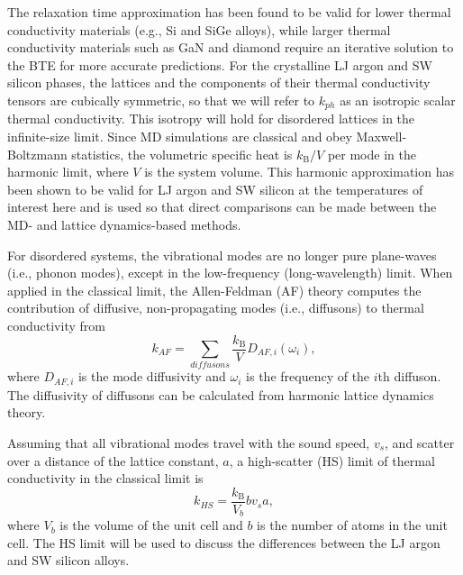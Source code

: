 \documentclass[12pt,twocolumn,iop]{/usr/share/texmf/tex/latex/iop/iopart}[/usr/share/texmf/tex/latex/iop/]
\begin{document}
The relaxation time approximation has been found to be valid  
for lower thermal conductivity materials 
(e.g., Si and SiGe alloys),
\cite{broido_intrinsic_2007,ward_intrinsic_2010,garg_role_2011} 
while larger thermal conductivity 
materials such as GaN and diamond require an  
iterative solution to the BTE for more accurate predictions.
\cite{ward_ab_2009,lindsay_thermal_2012} 
For the crystalline LJ argon and SW silicon phases, 
the lattices and the components of their 
thermal conductivity tensors are cubically symmetric, 
so that we will refer to 
$k_{ph}$ as an isotropic scalar thermal conductivity. 
This isotropy will hold for disordered lattices 
in the infinite-size limit. 
Since MD simulations are classical 
and obey Maxwell-Boltzmann 
statistics,\cite{mcquarrie_statistical_2000} the volumetric 
specific heat is $k_{\text{B}}/V$ per mode in the harmonic limit, where $V$ 
is the system volume. This harmonic approximation has been shown to be valid 
for LJ argon and SW silicon at the temperatures of interest here
\cite{mcgaughey_quantitative_2004,goicochea_thermal_2010} 
and is used so that direct comparisons can be made between 
the MD- and lattice dynamics-based methods.

For disordered systems, the vibrational modes are no 
longer pure plane-waves (i.e., phonon modes), except in the low-frequency 
(long-wavelength) limit. When applied in the classical limit, 
the Allen-Feldman (AF) theory computes 
the contribution of diffusive, non-propagating modes (i.e., diffusons) 
to thermal conductivity from\cite{allen_thermal_1993} 
\begin{equation}\label{EQ:M:k_AF}
k_{AF} = \sum_{diffusons} \frac{k_{\text{B}}}{V} D_{AF,i}(\omega_i),
\end{equation}
where $D_{AF,i}$ is the mode diffusivity and $\omega_i$ is the 
frequency of the $i$th diffuson. The diffusivity of diffusons 
can be calculated from harmonic lattice dynamics theory.
\cite{allen_thermal_1993,feldman_thermal_1993,feldman_numerical_1999} 

Assuming that all vibrational modes travel with the sound speed, $v_s$, and 
scatter over a distance of the lattice constant, $a$, 
a high-scatter (HS) limit of thermal conductivity in the classical 
limit is\cite{cahill_lattice_1988} 
\begin{equation}\label{EQ:M:k_AF,HS}
k_{HS} = \frac{k_{\text{B}}}{V_b}b v_s a,
\end{equation}
where $V_b$ is the volume of the unit cell and $b$ is the number of atoms 
in the unit cell. The HS limit will be used to 
discuss the differences between the LJ argon and SW silicon alloys. 
\end{document}
